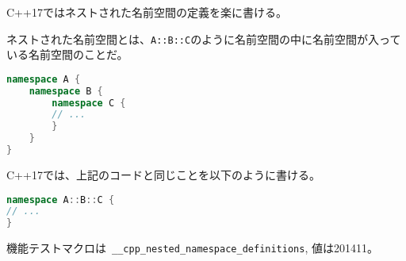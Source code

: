 %

C++17ではネストされた名前空間の定義を楽に書ける。

ネストされた名前空間とは、\lstinline!A::B::C!のように名前空間の中に名前空間が入っている名前空間のことだ。

\begin{lstlisting}[language=C++]
namespace A {
    namespace B {
        namespace C {
        // ...
        }
    }
} 
\end{lstlisting}

C++17では、上記のコードと同じことを以下のように書ける。

\begin{lstlisting}[language=C++]
namespace A::B::C {
// ...
}
\end{lstlisting}

機能テストマクロは~\lstinline!__cpp_nested_namespace_definitions!,
値は201411。
